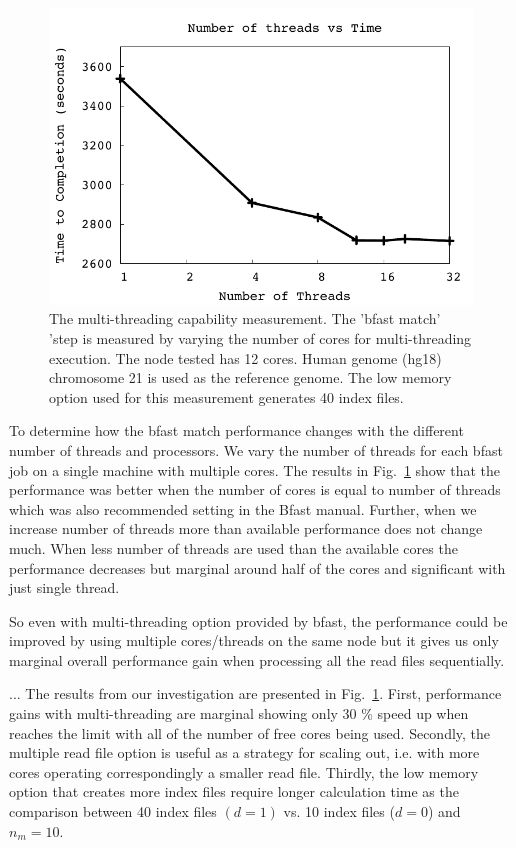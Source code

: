 \documentclass{acm_proc_article-sp}
\begin{document}
 \begin{figure}
 \centering
\includegraphics[scale=0.66]{figures/threadsvstime.pdf} 

\caption{\small The multi-threading capability measurement.  The
  'bfast match' 'step is measured by varying the number of cores for
  multi-threading execution.  The node tested has 12 cores.  Human
  genome (hg18) chromosome 21 is used as the reference
  genome. The low memory option used for this measurement generates 40 index files.  }
  \label{fig:parallel-execution} 
 \end{figure}
 
To determine how the bfast match performance changes with the different number of threads and 
processors. We vary the number of threads for each bfast job on a single machine with multiple cores. 
The results in Fig.~\ref{fig:parallel-execution} show that the performance was better when the number 
of cores is equal to number of threads which was also recommended setting in the Bfast manual. 
Further, when we increase number of threads more than available performance does not change much. 
When less number of threads are used than the available cores the performance 
decreases but marginal around half of the cores and significant with just single thread.


So even with multi-threading option provided by bfast, the performance
could be improved by using multiple cores/threads on the same node but
it gives us only marginal overall performance gain when processing all
the read files sequentially.

...  The results from our investigation are presented in
Fig.~\ref{fig:parallel-execution}. First, performance gains with
multi-threading are marginal showing only 30 \% speed up when reaches
the limit with all of the number of free cores being used.  Secondly,
the multiple read file option is useful as a strategy for scaling out,
i.e. with more cores operating correspondingly a smaller read file.
Thirdly, the low memory option that creates more index files require
longer calculation time as the comparison between 40 index files $(d =
1)$ vs. 10 index files ($ d = 0 $) and $n_m = 10$.
\end{document}
